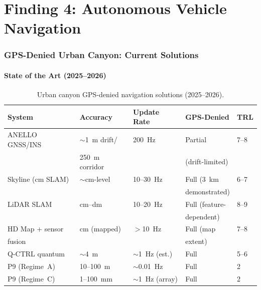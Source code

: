 \documentclass[11pt]{article}
\theoremstyle{definition}
\theoremstyle{remark}
\begin{document}
\part{Finding 4: Autonomous Vehicle Navigation}
\label{part:av}

\section{GPS-Denied Urban Canyon: Current Solutions}
\label{sec:urban-canyon}

\subsection{State of the Art (2025--2026)}

\begin{table}[H]
\centering
\caption{Urban canyon GPS-denied navigation solutions (2025--2026).}
\label{tab:urban-nav}
\begin{tabular}{@{}p{3cm}p{2.5cm}p{2.5cm}p{2cm}p{2cm}@{}}
\toprule
System & Accuracy & Update Rate & GPS-Denied & TRL \\
\midrule
ANELLO GNSS/INS & $\sim$1~m drift/ & 200~Hz & Partial & 7--8 \\
 & 250~m corridor & & (drift-limited) & \\
Skyline (cm SLAM) & $\sim$cm-level & 10--30~Hz & Full (3~km & 6--7 \\
 & & & demonstrated) & \\
LiDAR SLAM & cm--dm & 10--20~Hz & Full (feature- & 8--9 \\
 & & & dependent) & \\
HD Map + sensor & cm (mapped) & $>$10~Hz & Full (map & 7--8 \\
fusion & & & extent) & \\
Q-CTRL quantum & $\sim$4~m & $\sim$1~Hz (est.) & Full & 5--6 \\
\midrule
P9 (Regime~A) & 10--100~m & $\sim$0.01~Hz & Full & 2 \\
P9 (Regime~C) & 1--100~mm & $\sim$1~Hz (array) & Full & 2 \\
\bottomrule
\end{tabular}
\end{table}
\end{document}
